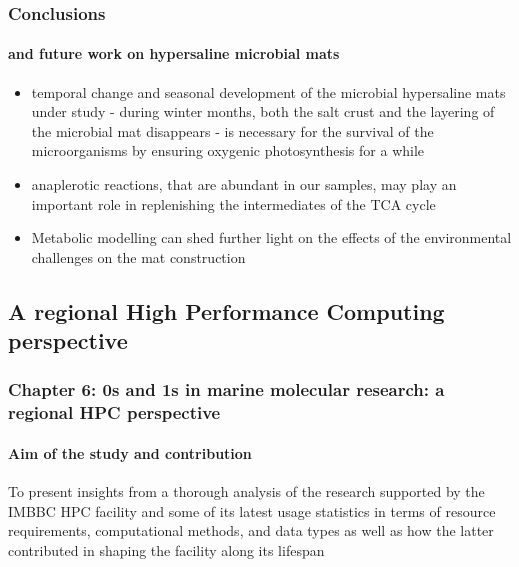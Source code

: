 \documentclass{beamer}
\begin{document}
   \begin{frame}
      \frametitle{Conclusions}
      \framesubtitle{and future work on hypersaline microbial mats}

      \begin{itemize}
         \item temporal change and seasonal development of the microbial hypersaline mats under study - during winter months,
         both the salt crust and the layering of the microbial mat disappears - is necessary for the survival of the microorganisms
         by ensuring oxygenic photosynthesis for a while 
         \item anaplerotic reactions, that are abundant in our samples, may play an important role in replenishing the intermediates of the TCA cycle
         \item Metabolic modelling can shed further light on the effects of the environmental challenges on the mat construction 
      \end{itemize}

   \end{frame}


   \begin{darkframes}
      \section{
         A regional High Performance Computing perspective
         }

      \begin{frame}
         \frametitle{\textbf{Chapter 6:} 0s and 1s in marine molecular research: a regional HPC perspective}
         \framesubtitle{Aim of the study and contribution}

         To present insights from a thorough analysis of the research supported by
         the IMBBC HPC facility and some of its latest usage statistics in terms of resource requirements, 
         computational methods, and data types as well as how the latter contributed in shaping the facility
         along its lifespan
         
      \end{frame}
   \end{darkframes}
\end{document}
